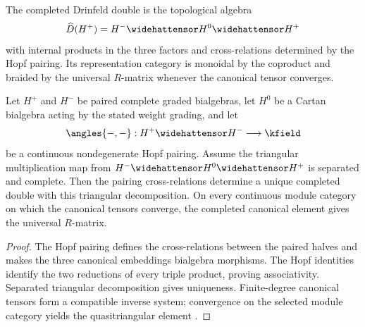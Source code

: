 \begin{definition}
The completed Drinfeld double is the topological algebra
\[
 \widehat D(H^+)=H^-\widehattensor H^0\widehattensor H^+
\]
with internal products in the three factors and cross-relations determined by the Hopf pairing. Its representation category is monoidal by the coproduct and braided by the universal $R$-matrix whenever the canonical tensor converges.
\end{definition}

\begin{theorem}
Let $H^+$ and $H^-$ be paired complete graded bialgebras, let $H^0$ be a Cartan bialgebra acting by the stated weight grading, and let
\[
 \angles{-,-}:H^+\widehattensor H^-\longrightarrow\kfield
\]
be a continuous nondegenerate Hopf pairing. Assume the triangular multiplication map from $H^-\widehattensor H^0\widehattensor H^+$ is separated and complete. Then the pairing cross-relations determine a unique completed double with this triangular decomposition. On every continuous module category on which the canonical tensors converge, the completed canonical element gives the universal $R$-matrix.
\end{theorem}
\begin{proof}
The Hopf pairing defines the cross-relations between the paired halves and makes the three canonical embeddings bialgebra morphisms. The Hopf identities identify the two reductions of every triple product, proving associativity. Separated triangular decomposition gives uniqueness. Finite-degree canonical tensors form a compatible inverse system; convergence on the selected module category yields the quasitriangular element \cite{DrinfeldDouble,EtingofSchiffmann}.
\end{proof}

